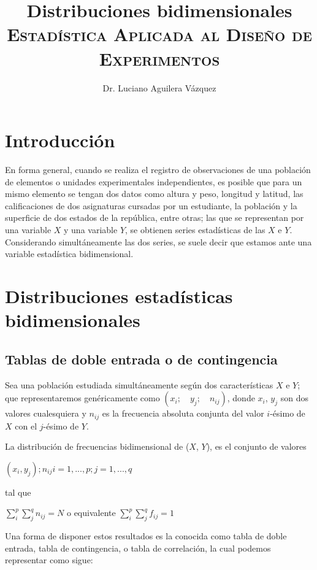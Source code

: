 \documentclass[11 pts, letterpaper, twosided]{article}
\title{Distribuciones bidimensionales\\
      {\normalsize \textsc{Estadística Aplicada al Diseño de Experimentos}}}
\author{Dr. Luciano Aguilera Vázquez}
\begin{document}
\maketitle

\section{Introducción}

En forma general, cuando se realiza el registro de observaciones de una
población de elementos o unidades experimentales independientes, es posible que para un mismo elemento se tengan dos datos como altura y peso, longitud y latitud, las calificaciones de dos asignaturas cursadas por un estudiante, la población y la superficie de dos estados de la república, entre otras; las que se representan por una variable $X$ y una variable $Y$, se obtienen series estadísticas de las $X$ e $Y$. Considerando simultáneamente las dos series, se suele decir que estamos ante una variable estadística bidimensional.

\section[Dist. est. bidimensionales]{Distribuciones estadísticas bidimensionales}

\subsection{Tablas de doble entrada o de contingencia}

Sea una población estudiada simultáneamente según dos características
$X$ e $Y$; que representaremos genéricamente como $(x_i;\quad
y_j;\quad n_{ij})$, donde $x_i$, $y_j$ son dos valores cualesquiera y
$n_{ij}$ es la frecuencia absoluta conjunta del valor $i$-ésimo de $X$
con el $j$-ésimo de $Y$.

La distribución de frecuencias bidimensional de ($X$, $Y$), es el
conjunto de valores

${(x_i, y_j); n_{ij}} i = 1, ..., p; j = 1, ..., q$

tal que

$\sum_i^p\sum_j^q n_{ij}= N$ o equivalente $\sum_i^p\sum_j^q f_{ij} = 1$

Una forma de disponer estos resultados es la conocida como tabla de
doble entrada, tabla de contingencia, o tabla de correlación, la cual podemos representar
como sigue:
\end{document}
